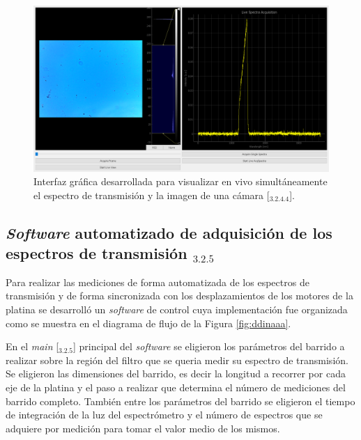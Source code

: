 \begin{figure}[H]
	\centering
	\includegraphics[width=1.0\textwidth]{Figs/microespectrometro/medicionbandacelesteGUI.png}
	\caption{Interfaz gráfica desarrollada para visualizar en vivo simultáneamente el espectro de transmisión y la imagen de una cámara [\href{https://github.com/jrr1984/defectsGUI/blob/master/start.py}{\faGithub$_{3.2.4.4}$}].}
	\label{fig:inaaa}
\end{figure}

 

\singlespacing
\subsection{\textit{Software} automatizado de adquisición de los espectros de transmisión \href{https://github.com/jrr1984/open\_frame\_XYStage/blob/master/main.py}{\faGithub$_{3.2.5}$}}
\label{sec:softadq}

 \hspace{0.5cm}Para realizar las mediciones de forma automatizada de los espectros de transmisión y de forma sincronizada con los desplazamientos de los motores de la platina se desarrolló un \textit{software} de control cuya implementación fue organizada como se muestra en el diagrama de flujo de la Figura \ref{fig:ddinaaa}.

En el \textit{main} [\href{https://github.com/jrr1984/open_frame_XYStage/blob/master/main.py}{\faGithub$_{3.2.5}$}] principal del \textit{software} se eligieron los parámetros del barrido a realizar sobre la región del filtro que se queria medir su espectro de transmisión. Se eligieron las dimensiones del barrido, es decir la longitud a recorrer por cada eje de la platina y el paso a realizar que determina el número de mediciones del barrido completo. También entre los parámetros del barrido se eligieron el tiempo de integración de la luz del espectrómetro y el número de espectros que se adquiere por medición para tomar el valor medio de los mismos.
 
